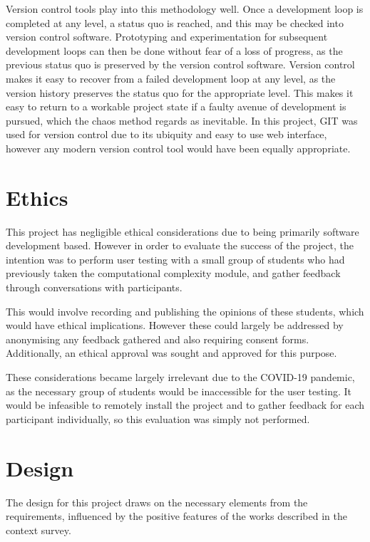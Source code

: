 \documentclass[11pt]{article}
\begin{document}
Version control tools play into this methodology well. Once a development loop is completed at any level, a status quo is reached, and this may be checked into version control software. Prototyping and experimentation for subsequent development loops can then be done without fear of a loss of progress, as the previous status quo is preserved by the version control software. Version control makes it easy to recover from a failed development loop at any level, as the version history preserves the status quo for the appropriate level. This makes it easy to return to a workable project state if a faulty avenue of development is pursued, which the chaos method regards as inevitable. In this project, GIT was used for version control due to its ubiquity and easy to use web interface, however any modern version control tool would have been equally appropriate.

\section{Ethics}

This project has negligible ethical considerations due to being primarily software development based. However in order to evaluate the success of the project, the intention was to perform user testing with a small group of students who had previously taken the computational complexity module, and gather feedback through conversations with participants.

This would involve recording and publishing the opinions of these students, which would have ethical implications. However these could largely be addressed by anonymising any feedback gathered and also requiring consent forms. Additionally, an ethical approval was sought and approved for this purpose.

These considerations became largely irrelevant due to the COVID-19 pandemic, as the necessary group of students would be inaccessible for the user testing. It would be infeasible to remotely install the project and to gather feedback for each participant individually, so this evaluation was simply not performed.

\section{Design}

The design for this project draws on the necessary elements from the requirements, influenced by the positive features of the works described in the context survey.
\end{document}

